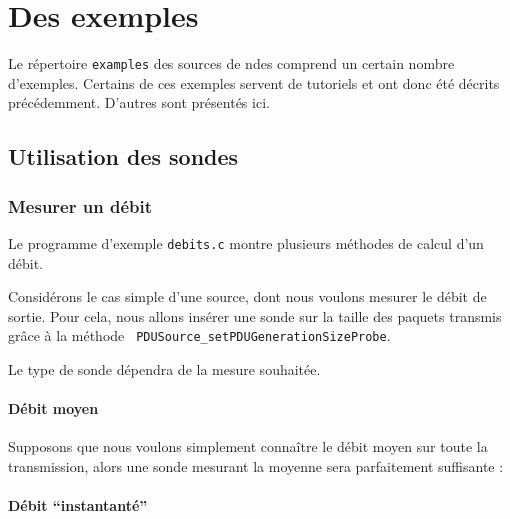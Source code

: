 %
\section{Des exemples}

   Le répertoire {\tt examples} des sources de {\sc ndes} comprend un
certain nombre d'exemples. Certains de ces exemples servent de
tutoriels et ont donc été décrits précédemment. D'autres sont
présentés ici.

%
\subsection{Utilisation des sondes}

\subsubsection{Mesurer un débit}

   Le programme d'exemple {\tt debits.c} montre plusieurs méthodes de
calcul d'un débit.

   Considérons le cas simple d'une source, dont nous voulons mesurer
le débit de sortie. Pour cela, nous allons insérer une sonde sur la
taille des paquets transmis grâce à la méthode {\tt
  PDUSource\_setPDUGenerationSizeProbe}.

   Le type de sonde dépendra de la mesure souhaitée.

%
\paragraph{Débit moyen}

   Supposons que nous voulons simplement connaître le débit moyen sur
toute la transmission, alors une sonde mesurant la moyenne sera parfaitement
suffisante :

%
\paragraph{Débit ``instantanté''}

